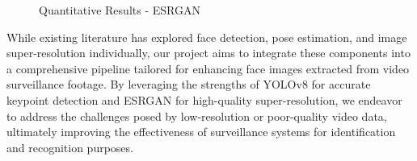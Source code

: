 \begin{figure}[H]
    \centering
    \caption{Quantitative Results - ESRGAN}
    \label{fig:enter-label}
\end{figure}

While existing literature has explored face detection, pose estimation, and image super-resolution individually, our project aims to integrate these components into a comprehensive pipeline tailored for enhancing face images extracted from video surveillance footage. By leveraging the strengths of YOLOv8 for accurate keypoint detection and ESRGAN for high-quality super-resolution, we endeavor to address the challenges posed by low-resolution or poor-quality video data, ultimately improving the effectiveness of surveillance systems for identification and recognition purposes.